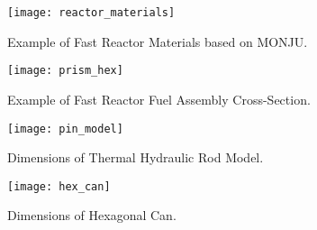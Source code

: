 \begin{frame}
  \begin{figure}
    \centering
    \texttt{[image: reactor\_materials]}
    \caption{Example of Fast Reactor Materials based on MONJU.}
    \label{fig:reactor_materials}
  \end{figure}
\end{frame}

\begin{frame}
  \begin{figure}
    \centering
    \texttt{[image: prism\_hex]}
    \caption{Example of Fast Reactor Fuel Assembly Cross-Section.}
    \label{fig:prism_hex}
  \end{figure}
\end{frame}

\begin{frame}
  \begin{figure}
    \centering
    \texttt{[image: pin\_model]}
    \caption{Dimensions of Thermal Hydraulic Rod Model.}
    \label{fig:pin_model}
  \end{figure}
\end{frame}

\begin{frame}
  \begin{figure}
    \centering
    \texttt{[image: hex\_can]}
    \caption{Dimensions of Hexagonal Can.}
    \label{fig:hex_can}
  \end{figure}
\end{frame}


